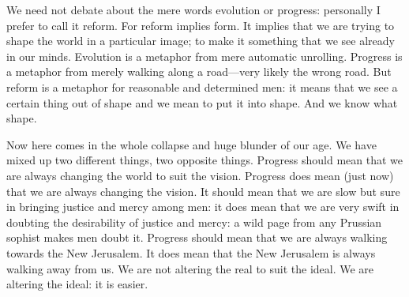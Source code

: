 We need not debate about the mere words evolution or progress: personally I prefer to call it reform. For reform implies form. It implies that we are trying to shape the world in a particular image; to make it something that we see already in our minds. Evolution is a metaphor from mere automatic unrolling. Progress is a metaphor from merely walking along a road—very likely the wrong road. But reform is a metaphor for reasonable and determined men: it means that we see a certain thing out of shape and we mean to put it into shape. And we know what shape.

Now here comes in the whole collapse and huge blunder of our age. We have mixed up two different things, two opposite things. Progress should mean that we are always changing the world to suit the vision. Progress does mean (just now) that we are always changing the vision. It should mean that we are slow but sure in bringing justice and mercy among men: it does mean that we are very swift in doubting the desirability of justice and mercy: a wild page from any Prussian sophist makes men doubt it. Progress should mean that we are always walking towards the New Jerusalem. It does mean that the New Jerusalem is always walking away from us. We are not altering the real to suit the ideal. We are altering the ideal: it is easier.

